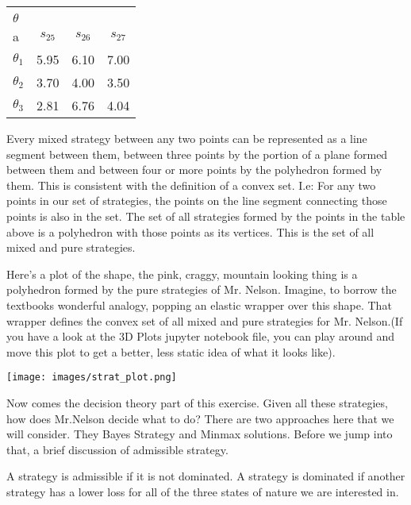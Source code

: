 \documentclass{article}
\begin{document}
\begin{tabular}{|l|c|c|c|}\hline
\diagbox[width=15em]{State of Nature\\$\theta$}{Strategy, s \\a}&
  $s_{25}$ & $s_{26}$ & $s_{27}$\\ \hline
  $\theta_1$ & 5.95 & 6.10 & 7.00\\ \hline
  $\theta_2$ & 3.70 & 4.00 & 3.50\\ \hline
  $\theta_3$ & 2.81 &6.76 & 4.04\\ \hline
\end{tabular}

\vspace{10mm} %
Every mixed strategy between any two points can be represented as a line segment between them, between three points by the portion of a plane formed between them and between four or more points by the polyhedron formed by them. This is consistent with the definition of a convex set. I.e: For any two points in our set of strategies, the points on the line segment connecting those points is also in the set. The set of all strategies formed by the points in the table above is a polyhedron with those points as its vertices. This is the set of all mixed and pure strategies. 
\vspace{5mm} %

Here's a plot of the shape, the pink, craggy, mountain looking thing is a polyhedron formed by the pure strategies of Mr. Nelson. Imagine, to borrow the textbooks wonderful analogy, popping an elastic wrapper over this shape. That wrapper defines the convex set of all mixed and pure strategies for Mr. Nelson.(If you have a look at the 3D Plots jupyter notebook file, you can play around and move this plot to get a better, less static idea of what it looks like).

\texttt{[image: images/strat\_plot.png]}

\vspace{5mm} %
Now comes the decision theory part of this exercise. Given all these strategies, how does Mr.Nelson decide what to do? There are two approaches here that we will consider. They Bayes Strategy and Minmax solutions. Before we jump into that, a brief discussion of admissible strategy. 

A strategy is admissible if it is not dominated. A strategy is dominated if another strategy has a lower loss for all of the three states of nature we are interested in. 
\end{document}
